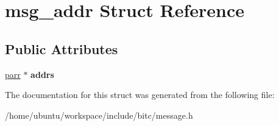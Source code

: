 \hypertarget{structmsg__addr}{\section{msg\-\_\-addr Struct Reference}
\label{structmsg__addr}
}
\subsection*{Public Attributes}
\begin{DoxyCompactItemize}
\item 
\hypertarget{structmsg__addr_a751c1b221e8225ede60ca244fffcc373}{\hyperlink{structparr}{parr} $\ast$ {\bfseries addrs}}\label{structmsg__addr_a751c1b221e8225ede60ca244fffcc373}

\end{DoxyCompactItemize}


The documentation for this struct was generated from the following file\-:\begin{DoxyCompactItemize}
\item 
/home/ubuntu/workspace/include/bitc/message.\-h\end{DoxyCompactItemize}
